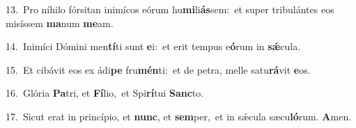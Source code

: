{\numbfont\textcolor{\numbcolor}{13.}}~Pro níhilo fórsitan inimícos eórum hu\-\textbf{mi}\-li\-\textbf{ás}\-sem:~\star et super tribulántes eos misíssem \textbf{ma}\-num \textbf{me}\-am.\par
{\numbfont\textcolor{\numbcolor}{14.}}~Inimíci Dómini men\-\textbf{tí}\-ti sunt \textbf{e}\-i:~\star et erit tempus e\-\textbf{ó}\-rum in \textbf{sǽ}\-cula.\par
{\numbfont\textcolor{\numbcolor}{15.}}~Et cibávit eos ex ádi\textbf{pe} fru\-\textbf{mén}\-ti:~\star et de petra, melle satu\-\textbf{rá}\-vit \textbf{e}\-os.\par
{\numbfont\textcolor{\numbcolor}{16.}}~Glória \textbf{Pa}\-tri, et \textbf{Fí}\-lio,~\star et Spi\-\textbf{rí}\-tui \textbf{Sanc}\-to.\par
{\numbfont\textcolor{\numbcolor}{17.}}~Sicut erat in princípio, et \textbf{nunc}\-, et \textbf{sem}\-per,~\star et in sǽcula sæcu\-\textbf{ló}\-rum. \textbf{A}\-men.\par
